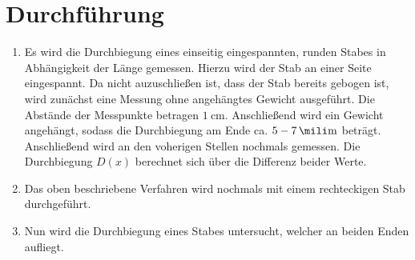 
\section{Durchführung}
\label{sec:Durchführung}

\renewcommand{\labelenumi}{\alph{enumi})}
\begin{enumerate}
  \item Es wird die Durchbiegung eines einseitig eingespannten, runden Stabes in
   Abhängigkeit der Länge gemessen. Hierzu wird der Stab an einer Seite eingespannt.
   Da nicht auzuschließen ist, dass der Stab bereits gebogen ist, wird zunächst
    eine Messung ohne angehängtes Gewicht ausgeführt. Die Abstände der Messpunkte betragen
     $\SI{1}{\centi\meter}$. Anschließend wird ein Gewicht angehängt, sodass
      die Durchbiegung am Ende ca. $5-\SI{7}{\mili\meter}$ beträgt. Anschließend
       wird an den voherigen Stellen nochmals gemessen. Die Durchbiegung $D(x)$
       berechnet sich über die Differenz beider Werte.

       \item Das oben beschriebene Verfahren wird nochmals mit einem
        rechteckigen Stab durchgeführt.

        \item Nun wird die Durchbiegung eines Stabes untersucht, welcher an beiden Enden aufliegt.
        
\end{enumerate}
